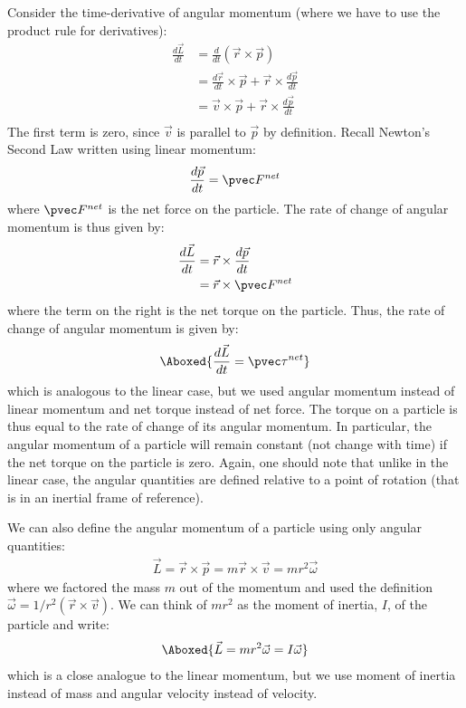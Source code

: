 Consider the time-derivative of angular momentum (where we have to use the product rule for derivatives):
\begin{align*}
\frac{d\vec L}{dt}  &= \frac{d}{dt} (\vec r\times \vec p)\\
&=\frac{d\vec r}{dt}\times \vec p + \vec r\times\frac{d\vec p}{dt}\\
&=\vec v\times \vec p + \vec r\times\frac{d\vec p}{dt}\\
\end{align*}
The first term is zero, since $\vec v$ is parallel to $\vec p$ by definition. Recall Newton's Second Law written using linear momentum:
\begin{align*}
\frac{d\vec p}{dt} = \pvec F^{net}
\end{align*}
where $\pvec F^{net}$ is the net force on the particle. The rate of change of angular momentum is thus given by:
\begin{align*}
\frac{d\vec L }{dt} &= \vec r\times\frac{d\vec p}{dt}\\
&=\vec r\times\pvec F^{net}
\end{align*}
where the term on the right is the net torque on the particle. Thus, the rate of change of angular momentum is given by:
\begin{align}
\Aboxed{\frac{d\vec L}{dt}   = \pvec \tau^{net}}
\end{align}
which is analogous to the linear case, but we used angular momentum instead of linear momentum and net torque instead of net force. The torque on a particle is thus equal to the rate of change of its angular momentum. In particular, the angular momentum of a particle will remain constant (not change with time) if the net torque on the particle is zero. Again, one should note that unlike in the linear case, the angular quantities are defined relative to a point of rotation (that is in an inertial frame of reference). 

We can also define the angular momentum of a particle using only angular quantities:
\begin{align*}
\vec L = \vec r \times \vec p =  m \vec r \times \vec v = mr^2 \vec\omega
\end{align*}
where we factored the mass $m$ out of the momentum and used the definition $\vec \omega = 1/r^2(\vec r \times \vec v)$. We can think of $mr^2$ as the moment of inertia, $I$, of the particle and write:
\begin{align}
\label{eq:angularmomentumrolling:liw}
\Aboxed{\vec L  = mr^2 \vec\omega = I \vec\omega}
\end{align}
which is a close analogue to the linear momentum, but we use moment of inertia instead of mass and angular velocity instead of velocity. 

